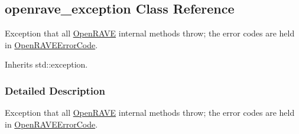 \hypertarget{classOpenRAVE_1_1openrave__exception}{
\subsection{openrave\_\-exception Class Reference}
\label{classOpenRAVE_1_1openrave__exception}
}


Exception that all \hyperlink{namespaceOpenRAVE}{OpenRAVE} internal methods throw; the error codes are held in \hyperlink{namespaceOpenRAVE_adf2fa050995e80f643f8eddc14d7262c}{OpenRAVEErrorCode}.  




Inherits std::exception.



\subsubsection{Detailed Description}
Exception that all \hyperlink{namespaceOpenRAVE}{OpenRAVE} internal methods throw; the error codes are held in \hyperlink{namespaceOpenRAVE_adf2fa050995e80f643f8eddc14d7262c}{OpenRAVEErrorCode}. 